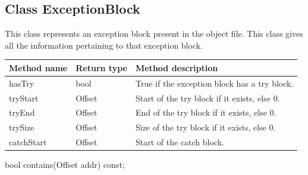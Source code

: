 \subsection{Class ExceptionBlock}
\label{ExceptionBlock}


This class represents an exception block present in the object file. This class gives all the information pertaining to that exception block.

\begin{tabularx}{\textwidth}{llX}
\toprule
Method name & Return type & Method description \\
\midrule
hasTry & bool & True if the exception block has a try block. \\
tryStart & Offset & Start of the try block if it exists, else 0. \\
tryEnd & Offset & End of the try block if it exists, else 0. \\
trySize & Offset & Size of the try block if it exists, else 0. \\
catchStart & Offset & Start of the catch block. \\
\bottomrule
\end{tabularx}


\begin{apient}
bool contains(Offset addr) const;
\end{apient}
